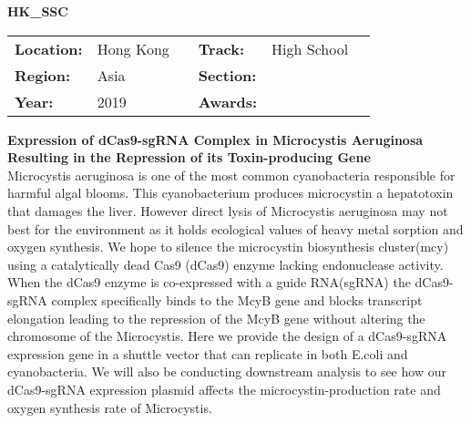 \textbf{\uppercase{HK\_SSC}} \FloatBarrier \begin{table}[h] \begin{tabular}{lp{2.5cm}llll} \textbf{Location:} & Hong Kong & \multicolumn{1}{|l}{} & \textbf{Track:}   & High School \\ \textbf{Region:}   & Asia   & \multicolumn{1}{|l}{} & \textbf{Section:} &  \\ \textbf{Year:}     & 2019   & \multicolumn{1}{|l}{} & \textbf{Awards:}  & \end{tabular} \end{table} \FloatBarrier \noindent\textbf{Expression of dCas9-sgRNA Complex in Microcystis Aeruginosa Resulting in the Repression of its Toxin-producing Gene} \vspace{.2cm}\\ 
Microcystis aeruginosa is one of the most common cyanobacteria responsible for harmful algal blooms. This cyanobacterium produces microcystin a hepatotoxin that damages the liver. However direct lysis of Microcystis aeruginosa may not best for the environment as it holds ecological values of heavy metal sorption and oxygen synthesis. We hope to silence the microcystin biosynthesis cluster(mcy) using a catalytically dead Cas9 (dCas9) enzyme lacking endonuclease activity. When the dCas9 enzyme is co-expressed with a guide RNA(sgRNA) the dCas9-sgRNA complex specifically binds to the McyB gene and blocks transcript elongation leading to the repression of the McyB gene without altering the chromosome of the Microcystis. Here we provide the design of a dCas9-sgRNA expression gene in a shuttle vector that can replicate in both E.coli and cyanobacteria. We will also be conducting downstream analysis to see how our dCas9-sgRNA expression plasmid affects the microcystin-production rate and oxygen synthesis rate of Microcystis.
\vspace{2cm}

